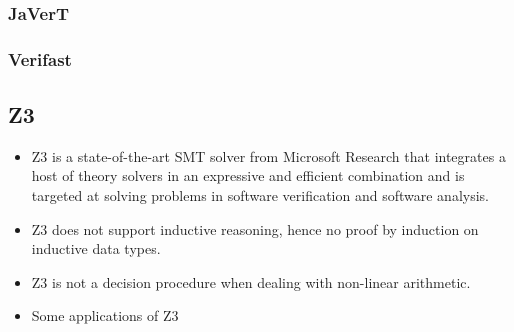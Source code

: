 \documentclass[12pt]{article}
\begin{document}
\subsubsection{JaVerT}

\subsubsection{Verifast}

\subsection{Z3}
\begin{itemize}
    \item Z3 is a state-of-the-art SMT solver from Microsoft Research that integrates a host of theory solvers in an expressive and efficient combination and is targeted at solving problems in software verification and software analysis.
    \item Z3 does not support inductive reasoning, hence no proof by induction on inductive data types.
    \item Z3 is not a decision procedure when dealing with non-linear arithmetic.
    \item Some applications of Z3
\end{itemize}
\end{document}
